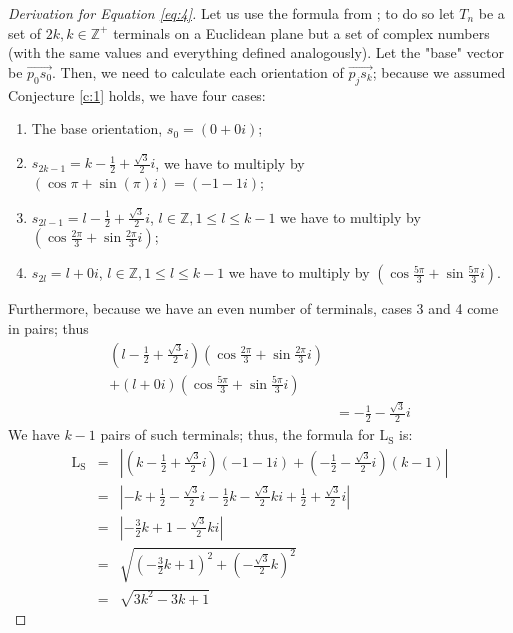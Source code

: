 \documentclass{mpaper}
\begin{document}
\begin{proof}[Derivation for Equation \ref{eq:4}]
  Let us use the formula from \cite{uteshev2021length}; to do so let $T_n$ be a set of $2k, k\in\mathbb{Z^+}$ terminals on a Euclidean plane but a set of complex numbers (with the same values and everything defined analogously). Let the "base" vector be $\overrightarrow{p_0s_0}$. Then, we need to calculate each orientation of $\overrightarrow{p_js_k}$; because we assumed Conjecture \ref{c:1} holds, we have four cases:
  \begin{enumerate}
    \item The base orientation, $s_0=(0+0i)$;
    \item $s_{2k-1}=k-\frac{1}{2}+\frac{\sqrt{3}}{2}i$, we have to multiply by $(\cos{\pi}+\sin({\pi})i)\allowbreak=(-1-1i)$;
    \item $s_{2l-1}=l-\frac{1}{2}+\frac{\sqrt{3}}{2}i$, $l\in\mathbb{Z}, 1\leq l\leq k-1$ we have to multiply by $(\cos{\frac{2\pi}{3}}+\sin{\frac{2\pi}{3}}i)$;
    \item $s_{2l}=l+0i$, $l\in\mathbb{Z}, 1\leq l\leq k-1$ we have to multiply by $(\cos{\frac{5\pi}{3}}+\sin{\frac{5\pi}{3}}i)$.
  \end{enumerate}
  Furthermore, because we have an even number of terminals, cases 3 and 4 come in pairs; thus 
  \begin{align*}
    (l-\frac{1}{2}+\frac{\sqrt{3}}{2}i)(\cos{\frac{2\pi}{3}}+\sin{\frac{2\pi}{3}}i)\\
    +(l+0i)(\cos{\frac{5\pi}{3}}+\sin{\frac{5\pi}{3}}i)\\
    &=-\frac{1}{2}-\frac{\sqrt{3}}{2}i
  \end{align*}
  We have $k-1$ pairs of such terminals; thus, the formula for $\operatorname{L_S}$ is:
  \begin{align*}
    \operatorname{L_S} &=& \left| (k-\frac{1}{2}+\frac{\sqrt{3}}{2}i)(-1-1i)+ (-\frac{1}{2}-\frac{\sqrt{3}}{2}i)(k-1)\right| \\ 
    &=& \left| -k+\frac{1}{2}-\frac{\sqrt{3}}{2}i-\frac{1}{2}k-\frac{\sqrt{3}}{2}ki+\frac{1}{2}+\frac{\sqrt{3}}{2}i\right| \\
    &=& \left|-\frac{3}{2}k+1-\frac{\sqrt{3}}{2}ki\right| \\
    &=& \sqrt{(-\frac{3}{2} k +1)^2 + (-\frac{\sqrt{3}}{2} k)^2} \\
    &=& \sqrt{3k^2 -3k + 1}
  \end{align*}
\end{proof}
\end{document}
